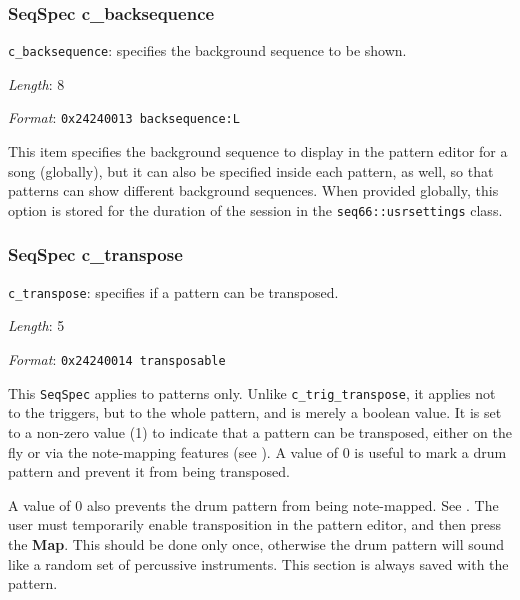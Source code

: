 \subsubsection{SeqSpec c\_backsequence}
\label{subsubsec:midi_format_track_seqspec_backsequence}

   \begin{description}
      \item \texttt{c\_backsequence}:
         specifies the background sequence to be shown.
      \item \textsl{Length}: 8
      \item \textsl{Format}: \texttt{0x24240013 backsequence:L}
   \end{description}

   This item specifies the background sequence to display in the pattern
   editor for a song (globally), but it
   can also be specified inside each pattern, as well, so that patterns
   can show different background sequences.
   When provided globally, this option is stored for the duration
   of the session in the
   \texttt{seq66::usrsettings} class.

\subsubsection{SeqSpec c\_transpose}
\label{subsubsec:midi_format_track_seqspec_transpose}

   \begin{description}
      \item \texttt{c\_transpose}: specifies if a pattern can be transposed.
      \item \textsl{Length}: 5
      \item \textsl{Format}: \texttt{0x24240014 transposable}
   \end{description}

   This
   \texttt{SeqSpec} applies to patterns only.
   Unlike \texttt{c\_trig\_transpose}, it applies not to the triggers, but
   to the whole pattern, and is merely a boolean value.
   It is set to a non-zero value (1) to indicate
   that a pattern can be transposed, either on the fly or via the
   note-mapping features (see ).
   A value of 0 is useful to mark a drum pattern and prevent it from being
   transposed.

   A value of 0 also prevents the drum pattern from being note-mapped.
   See .
   The user must temporarily enable transposition in the pattern editor, and
   then press the \textbf{Map}.  This should be done only once, otherwise the
   drum pattern will sound like a random set of percussive instruments.
   This section is always saved with the pattern.

